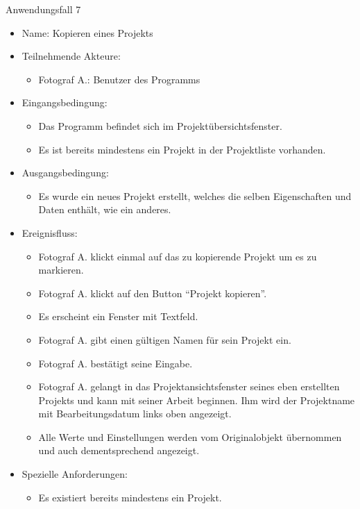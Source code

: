 	\begin{description}
		\item[Anwendungsfall 7]
	\end{description}
	
		\begin{itemize}
			\item Name: Kopieren eines Projekts
			\item Teilnehmende Akteure:
			\begin{itemize}
				\item	Fotograf A.: Benutzer des Programms		
			\end{itemize}
			\item Eingangsbedingung:
			\begin{itemize}
				\item	Das Programm befindet sich im Projektübersichtsfenster.
				\item Es ist bereits mindestens ein Projekt in der Projektliste vorhanden.			
			\end{itemize}
			\item Ausgangsbedingung:
			\begin{itemize}
				\item	Es wurde ein neues Projekt erstellt, welches die selben Eigenschaften und Daten enthält, wie ein anderes.	
			\end{itemize}
			\item Ereignisfluss:
			\begin{itemize}
				\item Fotograf A. klickt einmal auf das zu kopierende Projekt um es zu markieren.
				\item Fotograf A. klickt auf den Button "`Projekt kopieren"'.
				\item Es erscheint ein Fenster mit Textfeld.
				\item Fotograf A. gibt einen gültigen Namen für sein Projekt ein.
				\item Fotograf A. bestätigt seine Eingabe.
				\item Fotograf A. gelangt in das Projektansichtsfenster seines eben erstellten Projekts und kann mit seiner Arbeit beginnen. Ihm wird der Projektname mit Bearbeitungsdatum links oben angezeigt.
				\item Alle Werte und Einstellungen werden vom Originalobjekt übernommen und auch dementsprechend angezeigt.
			\end{itemize}
			\item Spezielle Anforderungen:
			\begin{itemize}
				\item	Es existiert bereits mindestens ein Projekt.		
			\end{itemize}			
		\end{itemize}
		
